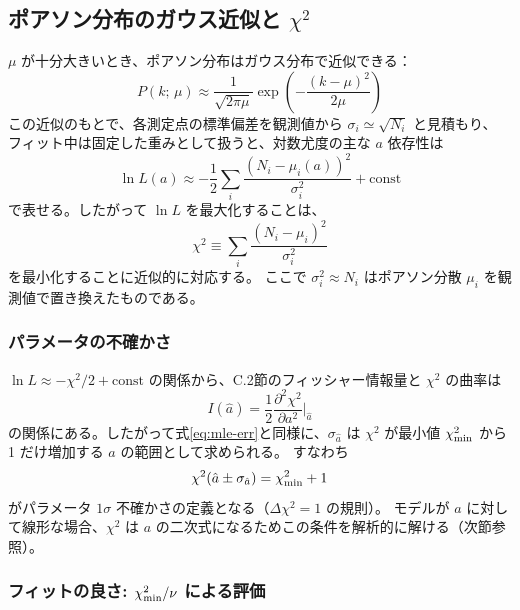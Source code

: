 \documentclass[uplatex,dvipdfmx,12pt,nomag]{jsarticle}
\begin{document}
\subsection{\texorpdfstring{ポアソン分布のガウス近似と $\chi^2$}{ポアソン分布のガウス近似と chi-square}}

$\mu$ が十分大きいとき、ポアソン分布はガウス分布で近似できる：
\begin{equation}
  P(k;\,\mu)
  \approx \frac{1}{\sqrt{2\pi\mu}}
    \exp\!\left(-\frac{(k-\mu)^2}{2\mu}\right)
\end{equation}
この近似のもとで、各測定点の標準偏差を観測値から $\sigma_i \simeq \sqrt{N_i}$ と見積もり、
フィット中は固定した重みとして扱うと、対数尤度の主な $a$ 依存性は
\begin{equation}
  \ln L(a)
  \approx -\frac{1}{2}\sum_{i}\frac{(N_i - \mu_i(a))^2}{\sigma_i^2} + \mathrm{const}
\end{equation}
で表せる。したがって $\ln L$ を最大化することは、
\begin{equation}
  \chi^2 \equiv \sum_{i}\frac{(N_i - \mu_i)^2}{\sigma_i^2}
  \label{eq:chisq}
\end{equation}
を最小化することに近似的に対応する。
ここで $\sigma_i^2 \approx N_i$ はポアソン分散 $\mu_i$ を観測値で置き換えたものである。

\subsubsection*{パラメータの不確かさ}

$\ln L \approx -\chi^2/2 + \mathrm{const}$ の関係から、C.2節のフィッシャー情報量と
$\chi^2$ の曲率は
\begin{equation}
  I(\hat{a}) = \frac{1}{2}\frac{\partial^2 \chi^2}{\partial a^2}\bigg|_{\hat{a}}
\end{equation}
の関係にある。したがって式\eqref{eq:mle-err}と同様に、$\sigma_{\hat{a}}$ は
$\chi^2$ が最小値 $\chi^2_{\rm min}$ から 1 だけ増加する $a$ の範囲として求められる。
すなわち
\begin{equation}
  \chi^2(\hat{a} \pm \sigma_{\hat{a}}) = \chi^2_{\rm min} + 1
  \label{eq:dchi2}
\end{equation}
がパラメータ $1\sigma$ 不確かさの定義となる（$\Delta\chi^2 = 1$ の規則）。
モデルが $a$ に対して線形な場合、$\chi^2$ は $a$ の二次式になるためこの条件を解析的に解ける（次節参照）。

\subsubsection*{フィットの良さ: $\chi^2_{\rm min}/\nu$ による評価}
\end{document}
